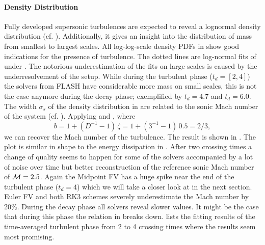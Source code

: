 \paragraph{Density Distribution}
Fully developed supersonic turbulences are expected to reveal a lognormal
density distribution (cf. ). Additionally, it gives
an insight into the distribution of mass from smallest to largest scales.
All log-log-scale density PDFs in 
show good indications for the presence of turbulence. The dotted lines are
log-normal fits of  under . The notorious
underestimation of the fits on large scales is caused by the underresolvement
of the setup. While during the turbulent phase
($t_d = [2,4]$) the solvers from FLASH have considerable more mass on small
scales, this is not the case anymore during the decay phase; exemplified by
$t_d = 4.7$ and $t_d = 6.0$.
The width $\sigma_s$ of the density distribution in
 are related to the sonic Mach
number of the system (cf. ). Applying
 and , where
\begin{equation}
b = 1 + (D^{-1} - 1) \, \zeta = 1 + (3^{-1} - 1) \, 0.5 = 2/3,
\end{equation}
we can recover the Mach number of the turbulence. The result is shown in
. The plot is similar in shape to
the energy dissipation in .
After two crossing times a change of quality seems to happen for some of the
solvers accompanied by a lot of noise over time but better reconstruction of
the reference sonic Mach number of $\mathcal{M} = 2.5$. Again the Midpoint FV has a huge
spike near the end of the turbulent  phase ($t_d = 4$) which we will take a closer
look at in the next section. Euler FV and both RK3 schemes severely
underestimate the Mach number by 20\%. During the decay phase all solvers
reveal slower values. It might be the case that during this phase the relation
in  breaks down.  lists the fitting results
of the time-averaged turbulent phase from 2 to 4 crossing times where the results
seem most promising.

